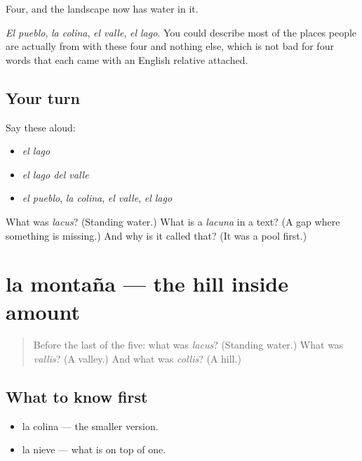 \begin{grammarlens}[title={What you've built}]
Four, and the landscape now has water in it.

\emph{El pueblo}, \emph{la colina}, \emph{el valle}, \emph{el lago}. You could describe most of the places people are actually from with these four and nothing else, which is not bad for four words that each came with an English relative attached.
\end{grammarlens}

\subsection*{Your turn}
Say these aloud:

\begin{itemize}
\raggedright
  \item \emph{el lago}
  \item \emph{el lago del valle}
  \item \emph{el pueblo}, \emph{la colina}, \emph{el valle}, \emph{el lago}
\end{itemize}

\begin{tcolorbox}[breakable,colback=teal!4,colframe=teal!35!black,title={Before you move on}]
What was \emph{lacus}? (Standing water.) What is a \emph{lacuna} in a text? (A gap where something is missing.) And why is it called that? (It was a pool first.)
\end{tcolorbox}
\section[la montaña]{la montaña — the hill inside amount}

\label{lesson:ES-C292-montana}



\begin{quote}
Before the last of the five: what was \emph{lacus}? (Standing water.) What was \emph{vallis}? (A valley.) And what was \emph{collis}? (A hill.)
\end{quote}

\subsection*{What to know first}
\begin{itemize}
\raggedright
  \item la colina — the smaller version.
  \item la nieve — what is on top of one.
\end{itemize}

